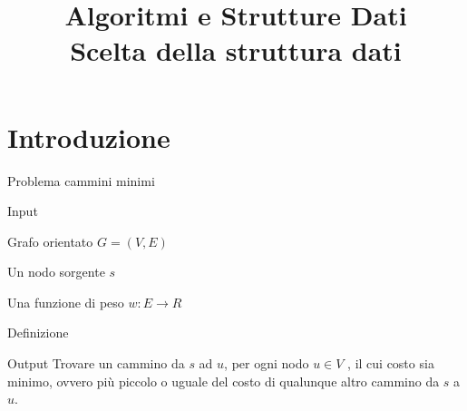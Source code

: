 
\title[ASD - Scelta struttura dati]{\textbf{Algoritmi e Strutture Dati}\\[24pt]Scelta della struttura dati}

\renewcommand{\Primo}{\mathit{start}\xspace}
\renewcommand{\Ultimo}{\mathit{end}\xspace}

\usepackage{tikz}
\usetikzlibrary{trees}
\usetikzlibrary{matrix}
\usetikzlibrary{graphs}
\usetikzlibrary{shapes}
\usetikzlibrary{positioning}
\usepackage{xmpmulti}
\usepackage{listings}





\graphicspath{{figs/11/}}



\FrameTitle{}

\FrameContent



\section{Introduzione}

\begin{frame}{Problema cammini minimi}

\vspace{-6	pt}
\begin{block}{Input}
\BI
\item \alert{Grafo orientato} $G=(V,E)$
\item Un nodo \alert{sorgente} $s$
\item Una \alert{funzione di peso} $w: E \rightarrow R$
\EI
\end{block}

\begin{block}{Definizione}
\smallskip
{}
\end{block}

\begin{block}{Output}
Trovare un cammino da $s$ ad $u$, per ogni nodo $u \in V$ , il cui costo sia minimo, ovvero più 
piccolo o uguale del costo di qualunque altro cammino da $s$ a $u$.
\end{block}

\end{frame}


